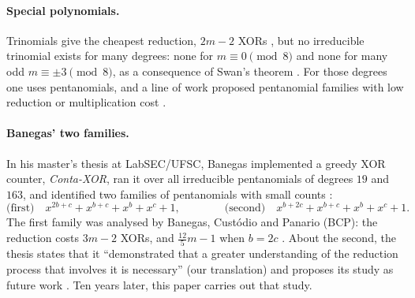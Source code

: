 \documentclass[11pt,a4paper]{article}
\theoremstyle{plain}
\theoremstyle{definition}
\begin{document}
\paragraph{Special polynomials.}
Trinomials give the cheapest reduction, $2m-2$ XORs \cite{SunarKoc1999,Wu2002}, but no
irreducible trinomial exists for many degrees: none for $m\equiv0\pmod 8$ and none for
many odd $m\equiv\pm3\pmod 8$, as a consequence of Swan's theorem \cite{Swan1962}. For
those degrees one uses pentanomials, and a line of work proposed pentanomial families
with low reduction or multiplication cost
\cite{HasanWangBhargava1992,RodriguezKoc2003,ReyhaniHasan2004,Cilardo2013,Imana2018,BCP2019}.

\paragraph{Banegas' two families.}
In his master's thesis at LabSEC/UFSC, Banegas implemented a greedy XOR counter,
\emph{Conta-XOR}, ran it over all irreducible pentanomials of degrees $19$ and $163$,
and identified two families of pentanomials with small counts \cite{Banegas2015}:
\[
\text{(first)}\quad x^{2b+c}+x^{b+c}+x^b+x^c+1,\qquad\qquad
\text{(second)}\quad x^{b+2c}+x^{b+c}+x^b+x^c+1 .
\]
The first family was analysed by Banegas, Custódio and Panario (BCP): the reduction
costs $3m-2$ XORs, and $\tfrac{12}{5}m-1$ when $b=2c$ \cite{BCP2019}. About the second,
the thesis states that it ``demonstrated that a greater understanding of the reduction
process that involves it is necessary'' (our translation) and proposes its study as future work
\cite[Sec.~4.5]{Banegas2015}. Ten years later, this paper carries out that study.
\end{document}
